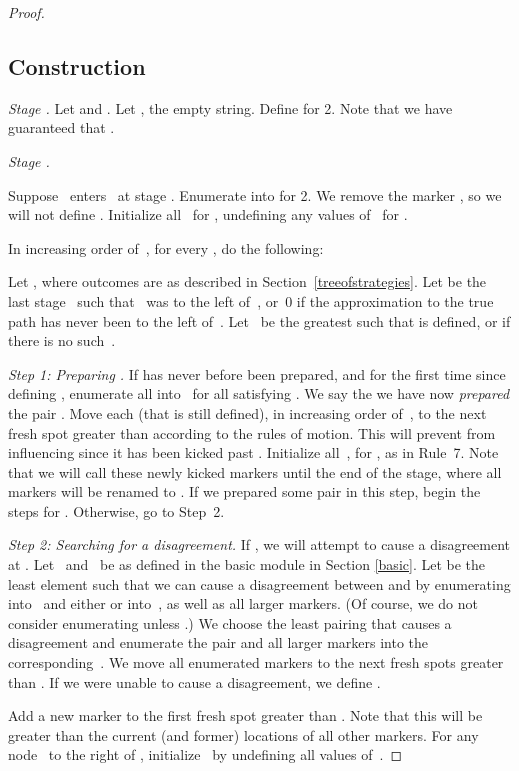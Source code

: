 \documentclass{LMCS}
\newcommand{\0}{\mathbf{0}}
\newcommand{\<}{\langle}
\renewcommand{\>}{\rangle}
\begin{document}
\begin{proof}
\subsection{Construction}\label{minpairconst}

{\em Stage .}  Let  and .  Let
, the empty string.  Define  for  2.
Note that we have guaranteed that .

{\em Stage .}

Suppose~ enters~ at stage .  Enumerate  into
 for  2.  We remove the marker , so we will
not define .  Initialize all~ for ,
undefining any values of~ for .

In increasing order of~, for every , do the following:

Let , where outcomes are as described in
Section~\ref{treeofstrategies}.  Let  be the last stage~ such
that~ was to the left of~, or~0 if the approximation to the
true path has never been to the left of~.  Let~ be the greatest
such that  is defined, or  if there is no such~.

{\em Step 1: Preparing .} If  has never before been prepared, and  for
the first time since defining , enumerate all
 into~ for all  satisfying .  We say the we have now {\em prepared} the pair .  Move each  (that is still defined), in
increasing order of~, to the next fresh spot greater than 
according to the rules of motion.  This will prevent 
from influencing  since it has been kicked past
. Initialize all~, for , as in
Rule~7.  Note that we will call these newly kicked markers
 until the end of the stage, where all markers will be
renamed to .  If we prepared some pair in this step,
begin the steps for .  Otherwise, go to Step~2.

{\em Step 2: Searching for a disagreement.}  If , we will
attempt to cause a disagreement at .  Let~ and~ be as defined
in the basic module in Section \ref{basic}.  Let 
be the least element such that we can cause a disagreement between
 and  by enumerating 
into~ and either  or  into~, as well as all larger markers.  (Of course, we do not consider
enumerating  unless .)
We choose the least pairing
that causes a disagreement and enumerate the pair and all larger markers into
the corresponding~.  We move all enumerated markers to the next fresh
spots greater than .  If we were unable to cause a disagreement, we
define .

Add a new marker  to the first fresh spot greater than
.  Note that this  will be greater than the current
(and former) locations of all other markers.
For any node~ to the right of , initialize~ by
undefining all values of~.


\end{proof}
\end{document}

